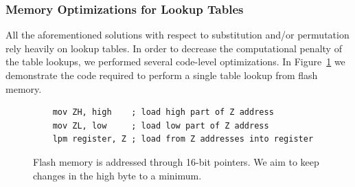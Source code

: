 \documentclass[11pt]{llncs2e} %
\begin{document}

 

\subsubsection{Memory Optimizations for Lookup Tables}
All the aforementioned solutions with respect to substitution and/or permutation rely heavily on lookup tables. In order to decrease the computational penalty of the table lookups, we performed several code-level optimizations.
In Figure~\ref{loading_code} we demonstrate the code required to perform a single table lookup from flash memory.

\begin{figure}[h]
\centering
	\begin{lstlisting}
	mov ZH, high    ; load high part of Z address
	mov ZL, low     ; load low part of Z address
	lpm register, Z ; load from Z addresses into register
	\end{lstlisting}
	\caption{\footnotesize Flash memory is addressed through 16-bit pointers. We aim to keep changes in the high byte to a minimum.}
\label{loading_code}
\end{figure}
\end{document}

